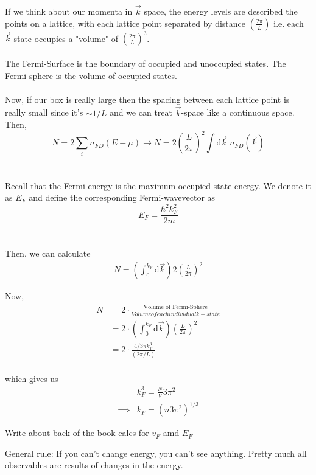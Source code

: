 \documentclass[11pt]{article}
\begin{document}
If we think about our momenta in $\vec{k}$ space, the energy levels are described the points on a lattice, with each lattice point separated by distance $\left(\frac{2\pi}{L}\right)$ i.e. each $\vec{k}$ state occupies a "volume" of $\left(\frac{2\pi}{L}\right)^3$.
\\
\\
The Fermi-Surface is the boundary of occupied and unoccupied states. The Fermi-sphere is the volume of occupied states.
\\
\\
Now, if our box is really large then the spacing between each lattice point is really small since it's $\sim 1/L$ and we can treat $\vec{k}$-space like a continuous space. Then,
$$ N = 2 \sum_{i} n_{FD}(E - \mu) \rightarrow N = 2 \left(\frac{L}{2\pi}\right)^2 \int \mathrm{d}\vec{k} \; n_{FD}\left(\vec{k} \right)$$
\\
\\
Recall that the Fermi-energy is the maximum occupied-state energy. We denote it as $E_F$ and define the corresponding Fermi-wavevector as 
$$ E_F = \frac{\hbar^2 k_F^2}{2m} $$
\\
\\
Then, we can calculate
\begin{align*}
  N = \left( \int_{0}^{k_F}  \mathrm{d}\vec{k}\right) 2 \left(\frac{L}{2\pi}\right)^2 
\end{align*}

Now,
\begin{align*}
  N &= 2 \cdot \frac{\text{Volume of Fermi-Sphere}}{Volume of each individual k-state} \\
  &= 2 \cdot  \left( \int_{0}^{k_F}  \mathrm{d}\vec{k}\right)  \left(\frac{L}{2\pi}\right)^2 \\
  &= 2 \cdot \frac{4/3 \pi k_F^3}{\left(2\pi/L\right)} \\
\end{align*}

which gives us 
\begin{align*}
  &k_F^3 = \frac{N}{V} 3 \pi^2 \\
  \implies& k_F = \left(n 3\pi^2\right)^{1/3}
\end{align*}

\begin{note}
  {Write about back of the book calcs for $v_F$ amd $E_F$}
\end{note}

\begin{bluebox}
  General rule: If you can't change energy, you can't see anything. Pretty much all observables are results of changes in the energy.
\end{bluebox}

\end{document}
